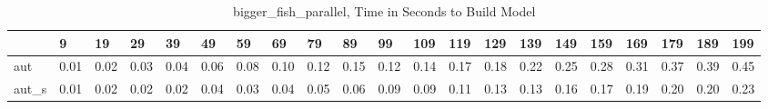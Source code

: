 \begin{table}
\caption{bigger_fish_parallel, Time in Seconds to Build Model}
\label{bigger_fish_parallel_model_time}
\begin{tabular}{lllllllllllllllllllll}
\toprule
 & 9 & 19 & 29 & 39 & 49 & 59 & 69 & 79 & 89 & 99 & 109 & 119 & 129 & 139 & 149 & 159 & 169 & 179 & 189 & 199 \\
\midrule
aut & 0.01 & 0.02 & 0.03 & 0.04 & 0.06 & 0.08 & 0.10 & 0.12 & 0.15 & 0.12 & 0.14 & 0.17 & 0.18 & 0.22 & 0.25 & 0.28 & 0.31 & 0.37 & 0.39 & 0.45 \\
aut_s & 0.01 & 0.02 & 0.02 & 0.02 & 0.04 & 0.03 & 0.04 & 0.05 & 0.06 & 0.09 & 0.09 & 0.11 & 0.13 & 0.13 & 0.16 & 0.17 & 0.19 & 0.20 & 0.20 & 0.23 \\
\bottomrule
\end{tabular}
\end{table}
